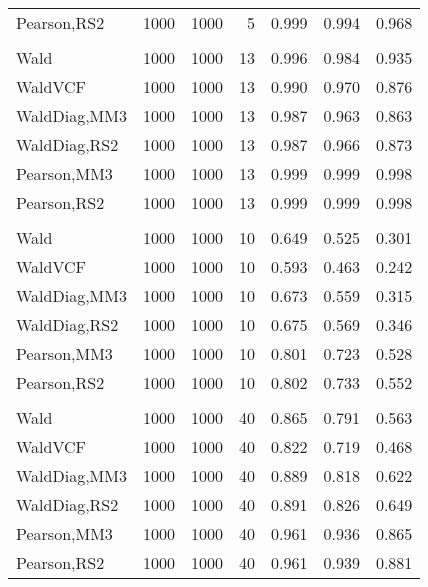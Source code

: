 \documentclass[
]{article}
\begin{document}
\begin{table}[H]
{\begin{tabular}[t]{lrrrrrr}
\hspace{1em}Pearson,RS2 & 1000 & 1000 & 5 & 0.999 & 0.994 & 0.968\\
\addlinespace[0.3em]
\multicolumn{7}{l}{\textbf{1F 15V}}\\
\hspace{1em}Wald & 1000 & 1000 & 13 & 0.996 & 0.984 & 0.935\\
\hspace{1em}WaldVCF & 1000 & 1000 & 13 & 0.990 & 0.970 & 0.876\\
\hspace{1em}WaldDiag,MM3 & 1000 & 1000 & 13 & 0.987 & 0.963 & 0.863\\
\hspace{1em}WaldDiag,RS2 & 1000 & 1000 & 13 & 0.987 & 0.966 & 0.873\\
\hspace{1em}Pearson,MM3 & 1000 & 1000 & 13 & 0.999 & 0.999 & 0.998\\
\hspace{1em}Pearson,RS2 & 1000 & 1000 & 13 & 0.999 & 0.999 & 0.998\\
\addlinespace[0.3em]
\multicolumn{7}{l}{\textbf{2F 10V}}\\
\hspace{1em}Wald & 1000 & 1000 & 10 & 0.649 & 0.525 & 0.301\\
\hspace{1em}WaldVCF & 1000 & 1000 & 10 & 0.593 & 0.463 & 0.242\\
\hspace{1em}WaldDiag,MM3 & 1000 & 1000 & 10 & 0.673 & 0.559 & 0.315\\
\hspace{1em}WaldDiag,RS2 & 1000 & 1000 & 10 & 0.675 & 0.569 & 0.346\\
\hspace{1em}Pearson,MM3 & 1000 & 1000 & 10 & 0.801 & 0.723 & 0.528\\
\hspace{1em}Pearson,RS2 & 1000 & 1000 & 10 & 0.802 & 0.733 & 0.552\\
\addlinespace[0.3em]
\multicolumn{7}{l}{\textbf{3F 15V}}\\
\hspace{1em}Wald & 1000 & 1000 & 40 & 0.865 & 0.791 & 0.563\\
\hspace{1em}WaldVCF & 1000 & 1000 & 40 & 0.822 & 0.719 & 0.468\\
\hspace{1em}WaldDiag,MM3 & 1000 & 1000 & 40 & 0.889 & 0.818 & 0.622\\
\hspace{1em}WaldDiag,RS2 & 1000 & 1000 & 40 & 0.891 & 0.826 & 0.649\\
\hspace{1em}Pearson,MM3 & 1000 & 1000 & 40 & 0.961 & 0.936 & 0.865\\
\hspace{1em}Pearson,RS2 & 1000 & 1000 & 40 & 0.961 & 0.939 & 0.881\\
\bottomrule
\end{tabular}}
\endgroup{}
\end{table}
\end{document}
